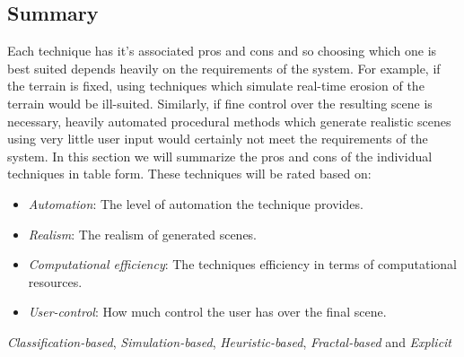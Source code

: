 \subsection{Summary} \label{Summary}

Each technique has it's associated pros and cons and so choosing which one is best suited depends heavily on the requirements of the system. For example, if the terrain is fixed, using techniques which simulate real-time erosion of the terrain would be ill-suited. Similarly, if fine control over the resulting scene is necessary, heavily automated procedural methods which generate realistic scenes using very little user input would certainly not meet the requirements of the system. In this section we will summarize the pros and cons of the individual techniques in table form. These techniques will be rated based on:
\begin{itemize}
\item \textit{Automation}: The level of automation the technique provides.
\item \textit{Realism}: The realism of generated scenes.
\item \textit{Computational efficiency}: The techniques efficiency in terms of computational resources.
\item \textit{User-control}: How much control the user has over the final scene. 
\end{itemize}

\textit{Classification-based}, \textit{Simulation-based}, \textit{Heuristic-based}, \textit{Fractal-based} and \textit{Explicit}

